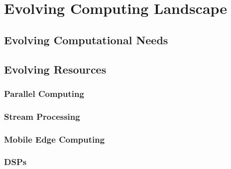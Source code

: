 \chapter{Evolving Computing Landscape}
\label{chapter:background}
\section{Evolving Computational Needs}
\section{Evolving Resources}
\subsection{Parallel Computing}
\subsection{Stream Processing}
\subsection{Mobile Edge Computing}
\subsection{DSPs}
